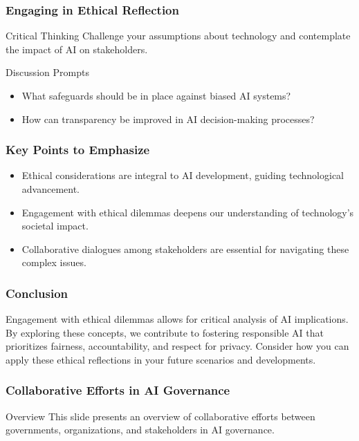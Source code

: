 \documentclass[aspectratio=169]{beamer}
\begin{document}
\begin{frame}[fragile]
    \frametitle{Engaging in Ethical Reflection}
    \begin{block}{Critical Thinking}
        Challenge your assumptions about technology and contemplate the impact of AI on stakeholders.
    \end{block}
    
    \begin{block}{Discussion Prompts}
        \begin{itemize}
            \item What safeguards should be in place against biased AI systems?
            \item How can transparency be improved in AI decision-making processes?
        \end{itemize}
    \end{block}
\end{frame}

\begin{frame}[fragile]
    \frametitle{Key Points to Emphasize}
    \begin{itemize}
        \item Ethical considerations are integral to AI development, guiding technological advancement.
        \item Engagement with ethical dilemmas deepens our understanding of technology’s societal impact.
        \item Collaborative dialogues among stakeholders are essential for navigating these complex issues.
    \end{itemize}
\end{frame}

\begin{frame}[fragile]
    \frametitle{Conclusion}
    Engagement with ethical dilemmas allows for critical analysis of AI implications. By exploring these concepts, we contribute to fostering responsible AI that prioritizes fairness, accountability, and respect for privacy. Consider how you can apply these ethical reflections in your future scenarios and developments.
\end{frame}

\begin{frame}[fragile]
    \frametitle{Collaborative Efforts in AI Governance}
    \begin{block}{Overview}
        This slide presents an overview of collaborative efforts between governments, organizations, and stakeholders in AI governance.
    \end{block}
\end{frame}
\end{document}
